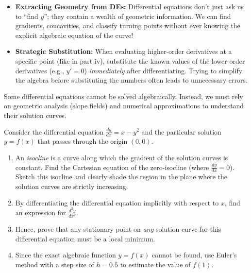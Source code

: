 \begin{takeaways}
\begin{itemize}[leftmargin=*]
    \item \textbf{Extracting Geometry from DEs:} Differential equations don't just ask us to ``find $y$''; they contain a wealth of geometric information. We can find gradients, concavities, and classify turning points without ever knowing the explicit algebraic equation of the curve!
    \item \textbf{Strategic Substitution:} When evaluating higher-order derivatives at a specific point (like in part iv), substitute the known values of the lower-order derivatives (e.g., $y'=0$) \textit{immediately} after differentiating. Trying to simplify the algebra before substituting the numbers often leads to unnecessary errors.
\end{itemize}
\end{takeaways}

\begin{problem}
Some differential equations cannot be solved algebraically. Instead, we must rely on geometric analysis (slope fields) and numerical approximations to understand their solution curves. 

Consider the differential equation $\frac{dy}{dx} = x - y^2$ and the particular solution $y = f(x)$ that passes through the origin $(0,0)$.

\begin{enumerate}
    \item[\textbf{i}] An \textit{isocline} is a curve along which the gradient of the solution curves is constant. Find the Cartesian equation of the zero-isocline (where $\frac{dy}{dx} = 0$). Sketch this isocline and clearly shade the region in the plane where the solution curves are strictly increasing.
    \item[\textbf{ii}] By differentiating the differential equation implicitly with respect to $x$, find an expression for $\frac{d^2y}{dx^2}$.
    \item[\textbf{iii}] Hence, prove that any stationary point on \textit{any} solution curve for this differential equation must be a local minimum.
    \item[\textbf{iv}] Since the exact algebraic function $y = f(x)$ cannot be found, use Euler's method with a step size of $h = 0.5$ to estimate the value of $f(1)$.
\end{enumerate}
\end{problem}

